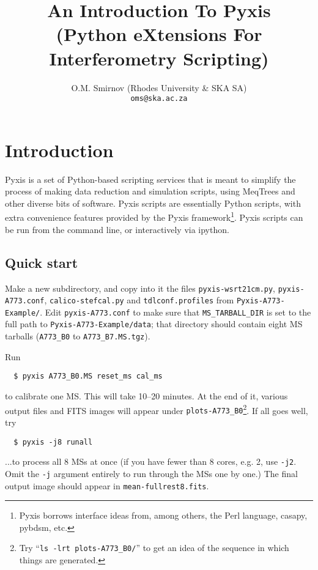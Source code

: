 \documentclass[a4paper,10pt]{article}
\title{An Introduction To Pyxis\\
(Python eXtensions For Interferometry Scripting)}
\author{O.M. Smirnov (Rhodes University \& SKA SA)\\
{\tt oms@ska.ac.za}}
\begin{document}
\maketitle

\section{Introduction}

Pyxis is a set of Python-based scripting services that is meant to simplify the process of making data reduction and simulation scripts, using MeqTrees and other diverse bits of software. Pyxis scripts are essentially Python scripts, with extra convenience features provided by the Pyxis framework\footnote{Pyxis borrows interface ideas from, among others, the Perl language, casapy, pybdsm, etc.}. Pyxis scripts can be run from the command line, or interactively via ipython.

\subsection{Quick start}

Make a new subdirectory, and copy into it the files {\tt pyxis-wsrt21cm.py}, {\tt pyxis-A773.conf}, {\tt calico-stefcal.py} and {\tt tdlconf.profiles} from {\tt Pyxis-A773-Example/}. Edit {\tt pyxis-A773.conf} to make sure that {\tt MS\_TARBALL\_DIR} is set to the full path to {\tt Pyxis-A773-Example/data}; that directory should contain eight MS tarballs ({\tt A773\_B0} to {\tt A773\_B7.MS.tgz}).

Run

\begin{verbatim}
  $ pyxis A773_B0.MS reset_ms cal_ms
\end{verbatim}

to calibrate one MS. This will take 10--20 minutes. At the end of it, various output files and FITS images will appear under
{\tt plots-A773\_B0}\footnote{Try ``{\tt ls -lrt plots-A773\_B0/}'' to get an idea of the sequence in which things are generated.}. If all goes well, try

\begin{verbatim}
  $ pyxis -j8 runall
\end{verbatim}

...to process all 8 MSs at once (if you have fewer than 8 cores, e.g. 2, use {\tt -j2}. Omit the {\tt -j} argument entirely 
to run through the MSs one by one.) The final output image should appear in {\tt mean-fullrest8.fits}.
\end{document}
